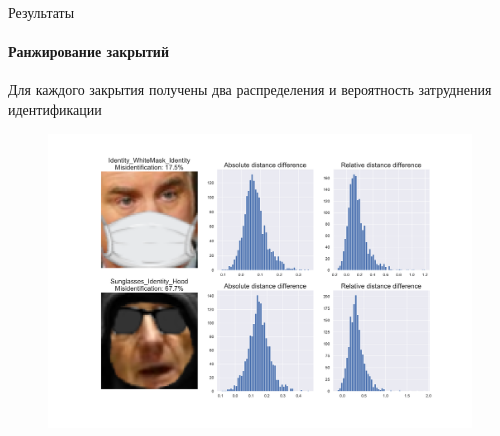 \documentclass{beamer}
\begin{document}

\begin{frame}{Результаты}
\framesubtitle{Ранжирование закрытий}
Для каждого закрытия получены два распределения и вероятность затруднения идентификации

\begin{figure}[h!]
    \centering
    \includegraphics[scale=0.21]{statistics_demo.pdf}
\end{figure}
\end{frame}

\end{document}
